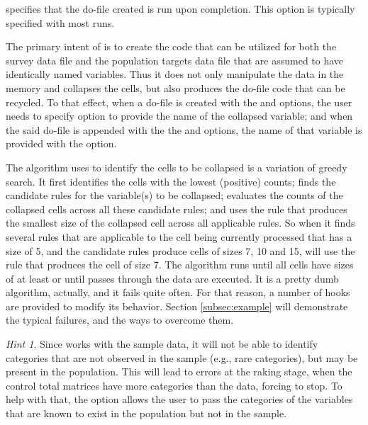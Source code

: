 \hangpara
{} specifies that the do-file created is run upon completion. This option is typically specified with most runs.

The primary intent of  is to create the code that can be
utilized for both the survey data file and the population targets data file that
are assumed to have identically named variables. Thus it does not only manipulate the data in the memory
and collapses the cells, but also produces the do-file code that can be recycled.
To that effect, when a do-file is created with the  and  options,
the user needs to specify  option to provide the name of the collapsed variable;
and when the said do-file is appended with the the  and  options,
the name of that variable is provided with the  option.

The algorithm  uses to identify the cells to be collapsed is
a variation of greedy search.
It first identifies the cells with the lowest (positive) counts; finds the candidate rules
for the variable(s) to be collapsed; evaluates the counts of the collapsed cells across all
these candidate rules; and uses the rule that produces the smallest size of the
collapsed cell across all applicable rules. So when it finds several rules that are applicable
to the cell being currently processed that has a size of 5, and the candidate rules produce cells
of sizes 7, 10 and 15,  will use the rule that produces the cell
of size 7. The algorithm runs until all cells have sizes of at least
 or until  passes through the data are executed.
It is a pretty dumb algorithm, actually, and it fails quite often.
For that reason, a number of hooks are provided to modify its behavior.
Section \ref{subsec:example} will demonstrate the typical failures, and the ways to overcome them.

\textit{Hint 1}. Since  works with the sample data,
it will not be able to identify categories that are not observed in the sample (e.g., rare categories),
but may be present in the population. This will lead to errors at the raking stage,
when the control total matrices have more categories than the data, forcing  to stop.
To help with that, the option  allows the user to pass the categories
of the variables that are known to exist in the population but not in the sample.


